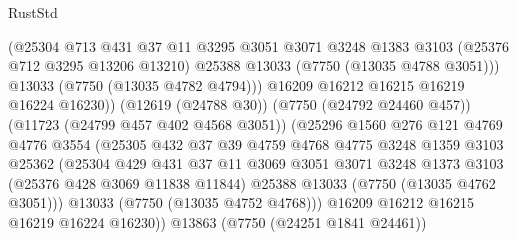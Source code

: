 \begin{lexlean}{RustStd}
\begin{coremodule}
                              (@25304
                                @713
                                @431
                                @37
                                @11
                                @3295
                                @3051
                                @3071
                                @3248
                                @1383
                                @3103
                                (@25376 @712 @3295 @13206 @13210)
                                @25388
                                @13033
                                (@7750 (@13035 @4788 @3051)))
                              @13033
                              (@7750 (@13035 @4782 @4794)))
                            @16209
                            @16212
                            @16215
                            @16219
                            @16224
                            @16230))
                        (@12619 (@24788 @30))
                        (@7750 (@24792 @24460 @457))
                        (@11723 (@24799 @457 @402 @4568 @3051))
                        (@25296
                          @1560
                          @276
                          @121
                          @4769
                          @4776
                          @3554
                          (@25305
                            @432
                            @37
                            @39
                            @4759
                            @4768
                            @4775
                            @3248
                            @1359
                            @3103
                            @25362
                            (@25304
                              @429
                              @431
                              @37
                              @11
                              @3069
                              @3051
                              @3071
                              @3248
                              @1373
                              @3103
                              (@25376 @428 @3069 @11838 @11844)
                              @25388
                              @13033
                              (@7750 (@13035 @4762 @3051)))
                            @13033
                            (@7750 (@13035 @4752 @4768)))
                          @16209
                          @16212
                          @16215
                          @16219
                          @16224
                          @16230))
                      @13863
                      (@7750 (@24251 @1841 @24461))

\end{coremodule}
\end{lexlean}
